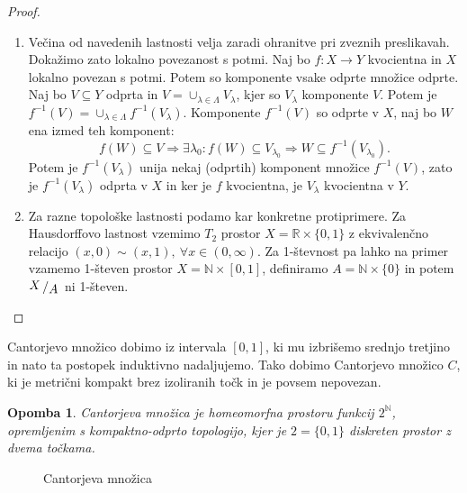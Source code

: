 \documentclass[10pt, a4paper]{article}
\newtheorem*{opomba}{Opomba}
\newenvironment{noticeC}{%
  \tcolorbox[%
  notitle,
  empty,
  enhanced,  %
  breakable,
  coltext=black, 
  fontupper=\rmfamily,
  noparskip,
  sharp corners,
  boxrule=-1pt,  %
  frame hidden,
  left=7pt,  %
  right=7pt,
  top=5pt,
  bottom=5pt,
  before skip=2.5ex plus 2pt,
  after skip=2.5ex plus 2pt,
  overlay unbroken and last={%
  },
  ]}
{\endtcolorbox}
\newenvironment{dokaz}%
  {\begin{noticeC}\begin{proof}}%
  {\end{proof}\end{noticeC}}
\newcommand{\N}{\mathbb {N}}
\newcommand{\R}{\mathbb {R}}
\newcommand{\quot}[2]{{\raisebox{0.1em}{$#1$}\left/\raisebox{-0.2em}{$#2$}\right.}}
\begin{document}
\begin{dokaz}
  \begin{enumerate}
    \item Večina od navedenih lastnosti velja zaradi ohranitve pri zveznih preslikavah.
    Dokažimo zato lokalno povezanost s potmi.
    Naj bo $f: X \to Y$ kvocientna in $X$ lokalno povezan s potmi.
    Potem so komponente vsake odprte množice odprte.
    Naj bo $V \subseteq Y$ odprta in $V = \cup_{\lambda \in \Lambda} V_\lambda$,
    kjer so $V_\lambda$ komponente $V$. Potem je $f^{-1} (V) = \cup_{\lambda \in \Lambda} f^{-1} (V_\lambda)$.
    Komponente $f^{-1} (V)$ so odprte v $X$, naj bo $W$ ena izmed teh komponent:
    $$f(W) \subseteq V \Rightarrow \exists \lambda_0 : f(W) \subseteq V_{\lambda_0} \Rightarrow W \subseteq f^{-1}(V_{\lambda_0}).$$
    Potem je $f^{-1} (V_\lambda)$ unija nekaj (odprtih) komponent množice $f^{-1} (V)$, zato je 
    $f^{-1} (V_\lambda)$ odprta v $X$ in ker je $f$ kvocientna, je $V_\lambda$ kvocientna v $Y$.
    
    \item Za razne topološke lastnosti podamo kar konkretne protiprimere.
    Za Hausdorffovo lastnost vzemimo $T_2$ prostor $X = \R \times \{0, 1\}$ z ekvivalenčno 
    relacijo $(x, 0) \sim (x, 1),\ \forall x \in (0, \infty)$.
    Za 1-števnost pa lahko na primer vzamemo 1-števen prostor $X = \N \times [0, 1]$, 
    definiramo $A = \N \times \{0\}$ in potem $\quot{X}{A}$ ni 1-števen. \qedhere
  \end{enumerate}
\end{dokaz}

Cantorjevo množico dobimo iz intervala $[0, 1]$, ki mu izbrišemo srednjo tretjino in nato ta postopek 
induktivno nadaljujemo. Tako dobimo Cantorjevo množico $C$, ki je metrični kompakt brez izoliranih točk 
in je povsem nepovezan.

\begin{opomba}
  Cantorjeva množica je homeomorfna prostoru funkcij $2^{\N}$,
  opremljenim s kompaktno-odprto topologijo, kjer je $2 = \{0, 1\}$
  diskreten prostor z dvema točkama.
\end{opomba}

\begin{figure}[htb!]
  \centering 
  \caption{Cantorjeva množica}
\end{figure}
\end{document}
